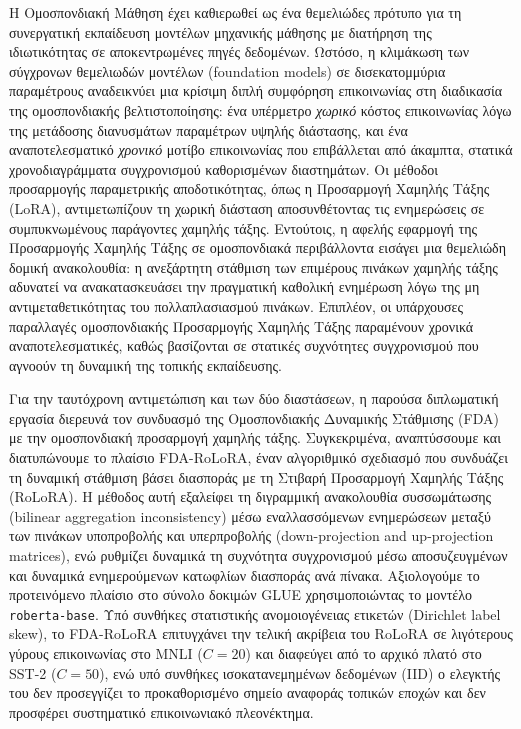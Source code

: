 
Η Ομοσπονδιακή Μάθηση έχει καθιερωθεί ως ένα θεμελιώδες πρότυπο για τη συνεργατική εκπαίδευση μοντέλων μηχανικής μάθησης με διατήρηση της ιδιωτικότητας σε αποκεντρωμένες πηγές δεδομένων. Ωστόσο, η κλιμάκωση των σύγχρονων θεμελιωδών μοντέλων ({\textlatin{foundation models}}) σε δισεκατομμύρια παραμέτρους αναδεικνύει μια κρίσιμη διπλή συμφόρηση επικοινωνίας στη διαδικασία της ομοσπονδιακής βελ\-τι\-στο\-ποί\-η\-σης: ένα υπέρμετρο \emph{χωρικό} κόστος επικοινωνίας λόγω της μετάδοσης διανυσμάτων παραμέτρων υψηλής διάστασης, και ένα αναποτελεσματικό \emph{χρονικό} μοτίβο επικοινωνίας που επιβάλλεται από άκαμπτα, στατικά χρονοδιαγράμματα \mbox{συγχρονισμού} καθορισμένων διαστημάτων. Οι μέθοδοι προσαρμογής παραμετρικής αποδοτικότητας, όπως η Προσαρμογή Χαμηλής Τάξης ({\textlatin{LoRA}}), αντιμετωπίζουν τη χωρική διάσταση αποσυνθέτοντας τις ενημερώσεις σε συμπυκνωμένους παράγοντες χαμηλής τάξης. Εντούτοις, η αφελής εφαρμογή της Προσαρμογής Χαμηλής Τάξης σε ομοσπονδιακά περιβάλλοντα εισάγει μια θεμελιώδη δομική ανακολουθία: η ανεξάρτητη στάθμιση των επιμέρους πινάκων χαμηλής τάξης αδυνατεί να ανακατασκευάσει την πραγματική καθολική ενημέρωση λόγω της μη αντιμεταθετικότητας του πολλαπλασιασμού πινάκων. Επιπλέον, οι υπάρχουσες παραλλαγές ομοσπονδιακής Προσαρμογής Χαμηλής Τάξης παραμένουν χρονικά αναποτελεσματικές, καθώς βασίζονται σε στατικές συχνότητες συγχρονισμού που αγνοούν τη δυναμική της τοπικής εκπαίδευσης.

Για την ταυτόχρονη αντιμετώπιση και των δύο διαστάσεων, η παρούσα διπλωματική εργασία διερευνά τον συνδυασμό της Ομοσπονδιακής Δυναμικής Στάθμισης ({\textlatin{FDA}}) με την ομοσπονδιακή προσαρμογή χαμηλής τάξης. Συγκεκριμένα, αναπτύσσουμε και διατυπώνουμε το πλαίσιο {\textlatin{FDA-RoLoRA}}, έναν αλγοριθμικό σχεδιασμό που συνδυάζει τη δυναμική στάθμιση βάσει διασποράς με τη Στιβαρή Προσαρμογή Χαμηλής Τάξης ({\textlatin{RoLoRA}}). Η μέθοδος αυτή εξαλείφει τη διγραμμική ανακολουθία συσσωμάτωσης ({\textlatin{bilinear aggregation inconsistency}}) μέσω εναλλασσόμενων ενημερώσεων μεταξύ των πινάκων υποπροβολής και υπερπροβολής ({\textlatin{down-projection and up-projection matrices}}), ενώ ρυθμίζει δυναμικά τη συχνότητα συγχρονισμού μέσω αποσυζευγμένων και δυναμικά ενημερούμενων κατωφλίων διασποράς ανά πίνακα. Αξιολογούμε το προτεινόμενο πλαίσιο στο σύνολο δοκιμών {\textlatin{GLUE}} χρησιμοποιώντας το μοντέλο {\textlatin{\texttt{roberta-base}}}. Υπό συνθήκες στατιστικής ανομοιογένειας ετικετών ({\textlatin{Dirichlet label skew}}), το {\textlatin{FDA-RoLoRA}} επιτυγχάνει την τελική ακρίβεια του {\textlatin{RoLoRA}} σε λιγότερους γύρους επικοινωνίας στο {\textlatin{MNLI}} ($C=20$) και διαφεύγει από το αρχικό πλατό στο {\textlatin{SST-2}} ($C=50$), ενώ υπό συνθήκες ισοκατανεμημένων δεδομένων ({\textlatin{IID}}) ο ελεγκτής του δεν προσεγγίζει το προκαθορισμένο σημείο αναφοράς τοπικών εποχών και δεν προσφέρει συστηματικό επικοινωνιακό πλεονέκτημα.
